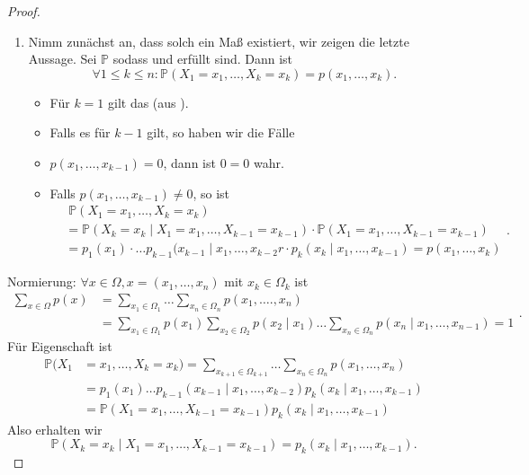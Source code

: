 \begin{proof}
    \begin{enumerate}[1)]
        \item Nimm zunächst an, dass solch ein Maß existiert, wir zeigen die letzte Aussage. Sei $\mathbb{P}$ sodass  und  erfüllt sind. Dann ist
             \[
                 \forall 1\leq k\leq n \colon \mathbb{P}(X_1=x_1,\ldots,X_k=x_k) = p(x_1,\ldots,x_k)
            .\] 
            \begin{itemize}
                \item Für $k=1$ gilt das (aus ).
                \item Falls es für $k-1$ gilt, so haben wir die Fälle
                \item  $p(x_1,\ldots,x_{k-1})=0$, dann ist $0=0$ wahr.
                \item Falls $p(x_1,\ldots,x_{k-1})\neq 0$, so ist
                    \[
                        \begin{split}
                        &\; \mathbb{P}(X_1=x_1,\ldots,X_k=x_k) \\
                        &= \mathbb{P}(X_k = x_k \mid  X_1 = x_1, \ldots, X_{k-1} = x_{k-1})\cdot \mathbb{P}(X_1=x_1, \ldots, X_{k-1} = x_{k-1}) \\
                        &= p_1(x_1)\cdot \ldots p_{k-1}(x_{k-1}\mid x_1,\ldots,x_{k-2}r\cdot p_k(x_k\mid x_1,\ldots,x_{k-1}) = p(x_1,\ldots,x_k)
                        \end{split}
                    .\] 
            \end{itemize}
    \end{enumerate}
    Normierung: $\forall x\in \Omega, x = (x_1,\ldots,x_n)$ mit $x_k \in \Omega_k$ ist
    \[
        \begin{split}
            \sum_{x\in \Omega} p(x) &= \sum_{x_1\in \Omega_1} \ldots \sum_{x_n \in \Omega_n} p(x_1,\ldots.,x_n) \\
                                    &= \sum_{x_1\in \Omega_1} p(x_1) \sum_{x_2\in \Omega_2} p(x_2\mid x_1) \ldots \sum_{x_n \in \Omega_n} p(x_n \mid  x_1,\ldots,x_{n-1}) = 1
        \end{split}
    .\] 
    Für Eigenschaft  ist
    \begin{equation*}
        \begin{split}
            \mathbb{P}(X_1&=x_1,\ldots,X_k=x_k) = \sum_{x_{k+1}\in \Omega_{k+1}} \ldots \sum_{x_n \in \Omega_n} p(x_1,\ldots,x_n) \\
                          &= p_1(x_1)\ldots p_{k-1}(x_{k-1}\mid  x_1,\ldots,x_{k-2}) p_k(x_k \mid  x_1,\ldots,x_{k-1}) \\
                          &= \mathbb{P}(X_1=x_1,\ldots,X_{k-1}=x_{k-1})p_k(x_k \mid  x_1,\ldots,x_{k-1})
        \end{split}
    \end{equation*}
    Also erhalten wir
    \[
        \mathbb{P}(X_k = x_k \mid  X_1 = x_1,\ldots,X_{k-1} = x_{k-1}) = p_k(x_k \mid  x_1,\ldots,x_{k-1})
    .\] 
\end{proof}

